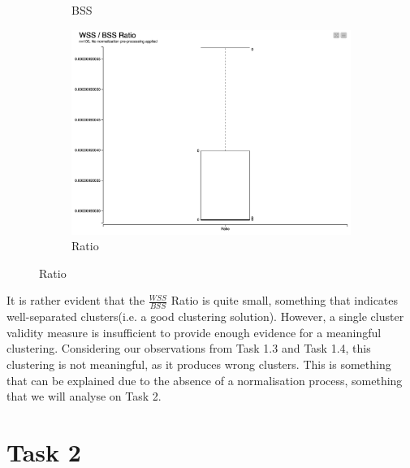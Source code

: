 \documentclass[11pt]{article}
\begin{document}
\begin{figure}[H]
\begin{subfigure}{0.4\textwidth}
						\caption{BSS}
						\label{fig:second}
					\end{subfigure}
					\hfill
					\begin{subfigure}{0.4\textwidth}
						\includegraphics[width=\textwidth]{res/t1/t15/t15-Ratio-plot}
						\caption{Ratio}
						\label{fig:third}
					\end{subfigure}
					\label{fig:figures}	
				\end{figure}
				\fi
				It is rather evident that the $\frac{WSS}{BSS}$ Ratio is quite small, something that indicates well-separated clusters(i.e. a good clustering solution). However, a single cluster validity measure is insufficient to provide enough evidence for a meaningful clustering. Considering our observations from Task 1.3 and Task 1.4, this clustering is not meaningful, as it produces wrong clusters. This is something that can be explained due to the absence of a normalisation process, something that we will analyse on Task 2.
	\section*{Task 2}
\end{document}
